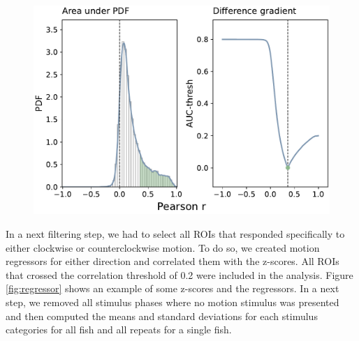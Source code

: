 \begin{figure}[H]
    \centering
    \includegraphics[width=0.8\linewidth]{figures/pcorrelation.pdf}
    \label{fig:pcorrelation}
\end{figure}

In a next filtering step, we had to select all ROIs that responded specifically to either clockwise or counterclockwise motion. To do so, we created motion regressors for either direction and correlated them with the z-scores. All ROIs that crossed the correlation threshold of 0.2 were included in the analysis. Figure \ref{fig:regressor} shows an example of some z-scores and the regressors. In a next step, we removed all stimulus phases where no motion stimulus was presented and then computed the means and standard deviations for each stimulus categories for all fish and all repeats for a single fish. 

